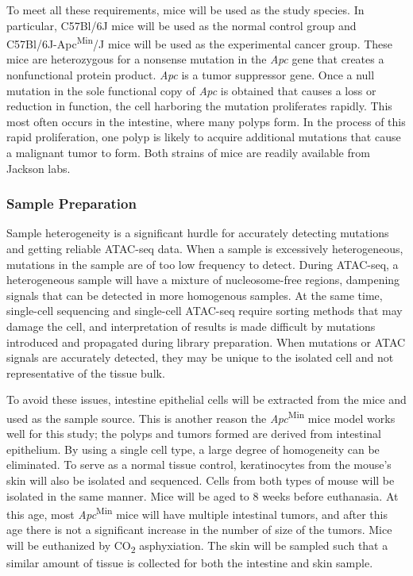 To meet all these requirements, mice will be used as the study species. In particular, C57Bl/6J mice will be used as the normal control group and C57Bl/6J-Apc\textsuperscript{Min}/J mice will be used as the experimental cancer group. These mice are heterozygous for a nonsense mutation in the \textit{Apc} gene that creates a nonfunctional protein product. \textit{Apc} is a tumor suppressor gene. Once a null mutation in the sole functional copy of \textit{Apc} is obtained that causes a loss or reduction in function, the cell harboring the mutation proliferates rapidly. This most often occurs in the intestine, where many polyps form. In the process of this rapid proliferation, one polyp is likely to acquire additional mutations that cause a malignant tumor to form. Both strains of mice are readily available from Jackson labs.

\subsubsection{Sample Preparation}

Sample heterogeneity is a significant hurdle for accurately detecting mutations and getting reliable ATAC-seq data. When a sample is excessively heterogeneous, mutations in the sample are of too low frequency to detect. During ATAC-seq, a heterogeneous sample will have a mixture of nucleosome-free regions, dampening signals that can be detected in more homogenous samples. At the same time, single-cell sequencing and single-cell ATAC-seq require sorting methods that may damage the cell, and interpretation of results is made difficult by mutations introduced and propagated during library preparation. When mutations or ATAC signals are accurately detected, they may be unique to the isolated cell and not representative of the tissue bulk.

To avoid these issues, intestine epithelial cells will be extracted from the mice and used as the sample source. This is another reason the \textit{Apc}\textsuperscript{Min} mice model works well for this study; the polyps and tumors formed are derived from intestinal epithelium. By using a single cell type, a large degree of homogeneity can be eliminated. To serve as a normal tissue control, keratinocytes from the mouse's skin will also be isolated and sequenced. Cells from both types of mouse will be isolated in the same manner. Mice will be aged to 8 weeks before euthanasia. At this age, most \textit{Apc}\textsuperscript{Min} mice will have multiple intestinal tumors, and after this age there is not a significant increase in the number of size of the tumors. Mice will be euthanized by CO\textsubscript{2} asphyxiation. The skin will be sampled such that a similar amount of tissue is collected for both the intestine and skin sample.

